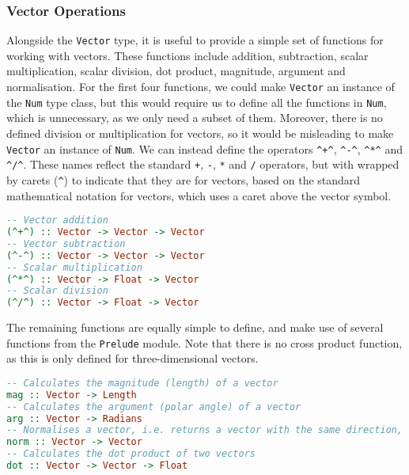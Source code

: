 \documentclass[../main.tex]{subfiles}
\begin{document}
            \subsubsection{Vector Operations}
                Alongside the \texttt{Vector} type, it is useful to provide a simple set of
                    functions for working with vectors.
                These functions include addition, subtraction, scalar multiplication, scalar
                    division, dot product, magnitude, argument and normalisation.
                For the first four functions, we could make \texttt{Vector} an instance of the
                    \texttt{Num} type class, but this would require us to define all the functions
                    in \texttt{Num}, which is unnecessary, as we only need a subset of them.
                Moreover, there is no defined division or multiplication for vectors, so it
                    would be misleading to make \texttt{Vector} an instance of \texttt{Num}.
                We can instead define the operators \verb|^+^|, \verb|^-^|, \verb|^*^| and
                    \verb|^/^|.
                These names reflect the standard \verb|+|, \verb|-|, \verb|*| and \verb|/|
                    operators, but with wrapped by carets (\verb|^|) to indicate that they are for
                    vectors, based on the standard mathematical notation for vectors, which uses a
                    caret above the vector symbol.

                \begin{lstlisting}[language={Haskell}, label={lst:vectorOps}, caption={The vector operators.}]
-- Vector addition
(^+^) :: Vector -> Vector -> Vector
-- Vector subtraction
(^-^) :: Vector -> Vector -> Vector
-- Scalar multiplication
(^*^) :: Vector -> Float -> Vector
-- Scalar division
(^/^) :: Vector -> Float -> Vector\end{lstlisting}

                The remaining functions are equally simple to define, and make use of several
                    functions from the \texttt{Prelude} module.
                Note that there is no cross product function, as this is only defined for
                    three-dimensional vectors.

                \begin{lstlisting}[language={Haskell}, label={lst:vectorFns}, caption={The remaining vector functions.}]
-- Calculates the magnitude (length) of a vector
mag :: Vector -> Length
-- Calculates the argument (polar angle) of a vector
arg :: Vector -> Radians
-- Normalises a vector, i.e. returns a vector with the same direction, but a magnitude of 1
norm :: Vector -> Vector
-- Calculates the dot product of two vectors
dot :: Vector -> Vector -> Float\end{lstlisting}
\end{document}
